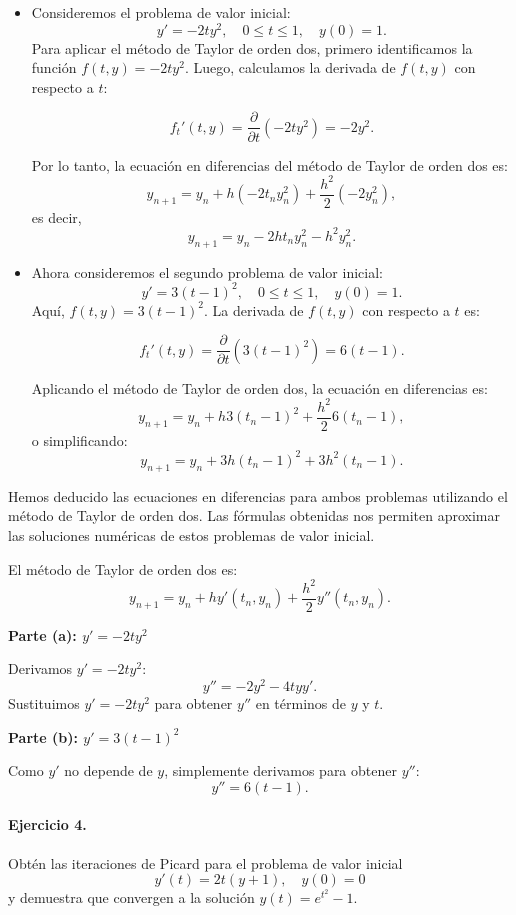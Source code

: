 \documentclass[12pt,letterpaper,oneside]{article}
\begin{document}
\begin{itemize}
    \item Consideremos el problema de valor inicial:
    \[
    y' = -2t y^2,\quad 0\leq t\leq 1,\quad y(0) = 1.
    \]
    Para aplicar el método de Taylor de orden dos, primero identificamos la función \( f(t, y) = -2t y^2 \). Luego, calculamos la derivada de \( f(t, y) \) con respecto a \( t \):
    
    \[
    f_t'(t, y) = \frac{\partial}{\partial t}(-2t y^2) = -2y^2.
    \]
    
    Por lo tanto, la ecuación en diferencias del método de Taylor de orden dos es:
    \[
    y_{n+1} = y_n + h (-2t_n y_n^2) + \frac{h^2}{2} (-2y_n^2),
    \]
    es decir,
    \[
    y_{n+1} = y_n - 2h t_n y_n^2 - h^2 y_n^2.
    \]
    
    
    \item Ahora consideremos el segundo problema de valor inicial:
    \[
    y' = 3(t-1)^2,\quad 0\leq t\leq 1,\quad y(0) = 1.
    \]
    Aquí, \( f(t, y) = 3(t-1)^2 \). La derivada de \( f(t, y) \) con respecto a \( t \) es:
    
    \[
    f_t'(t, y) = \frac{\partial}{\partial t} \left(3(t-1)^2 \right) = 6(t-1).
    \]
    
    Aplicando el método de Taylor de orden dos, la ecuación en diferencias es:
    \[
    y_{n+1} = y_n + h 3(t_n - 1)^2 + \frac{h^2}{2} 6(t_n - 1),
    \]
    o simplificando:
    \[
    y_{n+1} = y_n + 3h (t_n - 1)^2 + 3h^2 (t_n - 1).
    \]
\end{itemize}

Hemos deducido las ecuaciones en diferencias para ambos problemas utilizando el método de Taylor de orden dos. Las fórmulas obtenidas nos permiten aproximar las soluciones numéricas de estos problemas de valor inicial.


El método de Taylor de orden dos es:
\[
y_{n+1} = y_n + h y'(t_n, y_n) + \frac{h^2}{2} y''(t_n, y_n).
\]

\textbf{Parte (a): $y'=-2ty^2$}


Derivamos $y' = -2ty^2$:
\[
y'' = -2y^2 - 4tyy'.
\]
Sustituimos $y' = -2ty^2$ para obtener $y''$ en términos de $y$ y $t$.

\textbf{Parte (b): $y' = 3(t-1)^2$}

Como $y'$ no depende de $y$, simplemente derivamos para obtener $y''$:
\[
y'' = 6(t-1).
\]

\paragraph*{Ejercicio 4.} Obtén las iteraciones de Picard para el problema de valor inicial
\[
y'(t) = 2t(y+1),\quad y(0)=0
\]
y demuestra que convergen a la solución \(y(t)=e^{t^2}-1\).
\end{document}
